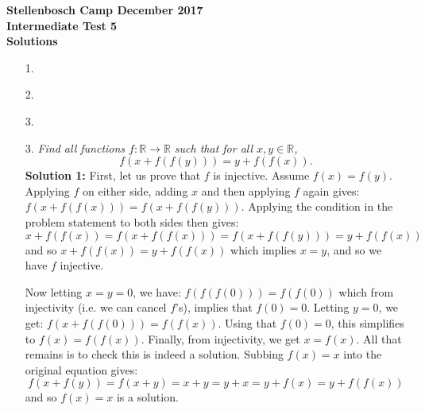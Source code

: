 \documentclass[a4paper,12pt]{article}
\begin{document}
\begin{center}
\textbf{Stellenbosch Camp December 2017 \\ Intermediate Test 5} \\
\textbf{Solutions}
\end{center}


\begin{enumerate}
  
  \item[1.] 
  
  
  \item[2.] 
  
  
  \item[3.] 


  \item[3.] \emph{Find all functions $f: \mathbb{R} \to \mathbb{R}$ such that for all $x,y \in \mathbb{R}$,
\[ f(x+f(f(y))) = y+f(f(x)). \]}
  \textbf{Solution 1:} First, let us prove that $f$ is injective. Assume $f(x)=f(y)$. Applying $f$ on either side, adding $x$ and then applying $f$ again gives: $f(x+f(f(x))) = f(x+f(f(y)))$. Applying the condition in the problem statement to both sides then gives:  
  \begin{equation*}
    x+f(f(x)) = f(x+f(f(x))) = f(x+f(f(y))) = y+f(f(x)) 
  \end{equation*} 
  and so $x+f(f(x)) = y+f(f(x))$ which implies $x=y$, and so we have $f$ injective.
  
  Now letting $x=y=0$, we have: $f(f(f(0))) = f(f(0))$ which from injectivity (i.e. we can cancel $f$'s), implies that $f(0)=0$. Letting $y=0$, we get: $f(x+f(f(0))) = f(f(x))$. Using that $f(0)=0$, this simplifies to $f(x)=f(f(x))$. Finally, from injectivity, we get $x=f(x)$. All that remains is to check this is indeed a solution. Subbing $f(x)=x$ into the original equation gives:
  \begin{equation*}
    f(x+f(y)) = f(x+y) = x+y = y+x = y+f(x) = y+f(f(x))
  \end{equation*}
  and so $f(x)=x$ is a solution.
  

\end{enumerate}
\end{document}
